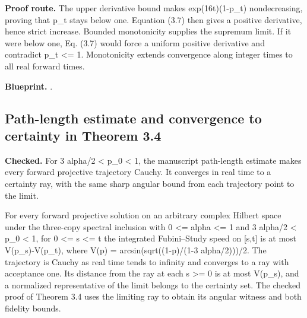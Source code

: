 \textbf{Proof route.} The upper derivative bound makes exp(16t)(1-p\_t) nondecreasing, proving that p\_t stays below one. Equation (3.7) then gives a positive derivative, hence strict increase. Bounded monotonicity supplies the supremum limit. If it were below one, Eq. (3.7) would force a uniform positive derivative and contradict p\_t <= 1. Monotonicity extends convergence along integer times to all real forward times.


\textbf{Blueprint.} .

\subsection{Path-length estimate and convergence to certainty in Theorem 3.4}\label{paper:flow-ray-limit}
\textbf{Checked.} For 3 alpha/2 < p\_0 < 1, the manuscript path-length estimate makes every forward projective trajectory Cauchy. It converges in real time to a certainty ray, with the same sharp angular bound from each trajectory point to the limit. 

For every forward projective solution on an arbitrary complex Hilbert space under the three-copy spectral inclusion with 0 <= alpha <= 1 and 3 alpha/2 < p\_0 < 1, for 0 <= s <= t the integrated Fubini–Study speed on [s,t] is at most V(p\_s)-V(p\_t), where V(p) = arcsin(sqrt((1-p)/(1-3 alpha/2)))/2. The trajectory is Cauchy as real time tends to infinity and converges to a ray with acceptance one. Its distance from the ray at each s >= 0 is at most V(p\_s), and a normalized representative of the limit belongs to the certainty set. The checked proof of Theorem 3.4 uses the limiting ray to obtain its angular witness and both fidelity bounds.

